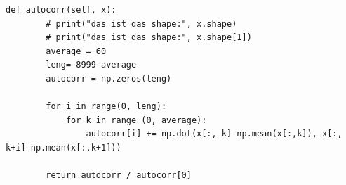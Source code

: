 \label{attachement:autocorrelation}
\begin{lstlisting}
def autocorr(self, x):
        # print("das ist das shape:", x.shape)
        # print("das ist das shape:", x.shape[1])
        average = 60
        leng= 8999-average
        autocorr = np.zeros(leng)
        
        for i in range(0, leng):
            for k in range (0, average):
                autocorr[i] += np.dot(x[:, k]-np.mean(x[:,k]), x[:, k+i]-np.mean(x[:,k+1])) 

        return autocorr / autocorr[0]
\end{lstlisting}
